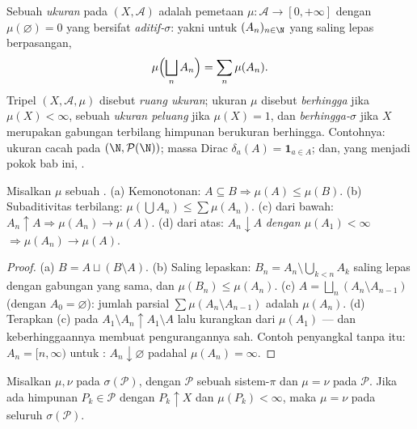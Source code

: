 \begin{definition}\label{def:b3:measure:measure}
Sebuah \emph{ukuran} pada $(X, \mathcal A)$ adalah pemetaan
$\mu \colon \mathcal A \to [0, +\infty]$ dengan $\mu(\varnothing)
= 0$ yang bersifat \emph{aditif-$\sigma$}: yakni untuk
$(A_n)_{n\in\N}$ yang saling lepas berpasangan,
\[
\mu\Bigl(\bigsqcup_n A_n\Bigr) = \sum_n \mu(A_n).
\]
Tripel $(X, \mathcal A, \mu)$ disebut \emph{ruang ukuran}; ukuran $\mu$ disebut
\emph{berhingga} jika $\mu(X) < \infty$, sebuah \emph{ukuran
peluang} jika $\mu(X) = 1$, dan \emph{berhingga-$\sigma$} jika $X$ merupakan
gabungan terbilang himpunan berukuran berhingga. Contohnya: ukuran
cacah pada $(\N, \mathcal P(\N))$; massa Dirac $\delta_a(A)
= \mathbf 1_{a \in A}$; dan, yang menjadi pokok bab ini,
.
\end{definition}

\begin{proposition}\label{prop:b3:measure:basics}
Misalkan $\mu$ sebuah . (a) Kemonotonan: $A \subseteq B
\Rightarrow \mu(A) \leq \mu(B)$. (b) Subaditivitas terbilang:
$\mu(\bigcup A_n) \leq \sum\mu(A_n)$. (c)  dari
bawah: $A_n \uparrow A \Rightarrow \mu(A_n) \to \mu(A)$. (d)
 dari atas: $A_n \downarrow A$ \emph{dengan
$\mu(A_1) < \infty$} $\Rightarrow \mu(A_n) \to \mu(A)$.
\end{proposition}

\begin{proof}
(a) $B = A \sqcup (B\setminus A)$. (b) Saling lepaskan: $B_n = A_n
\setminus \bigcup_{k<n}A_k$ saling lepas dengan gabungan yang sama,
dan $\mu(B_n) \leq \mu(A_n)$. (c) $A = \bigsqcup_n (A_n
\setminus A_{n-1})$ (dengan $A_0 = \varnothing$): jumlah parsial
$\sum\mu(A_n\setminus A_{n-1})$ adalah $\mu(A_n)$. (d) Terapkan (c)
pada $A_1 \setminus A_n \uparrow A_1 \setminus A$ lalu kurangkan
dari $\mu(A_1)$ --- dan keberhinggaannya membuat pengurangannya
sah. Contoh penyangkal tanpa itu: $A_n = [n, \infty)$ untuk
: $A_n \downarrow \varnothing$ padahal $\mu(A_n) =
\infty$.
\end{proof}

\begin{theorem}[Ketunggalan]\label{thm:b3:measure:uniqueness}
Misalkan $\mu, \nu$  pada $\sigma(\mathcal P)$, dengan $\mathcal
P$ sebuah sistem-$\pi$ dan $\mu = \nu$ pada $\mathcal P$. Jika ada
himpunan $P_k \in \mathcal P$ dengan $P_k \uparrow X$ dan
$\mu(P_k) < \infty$, maka $\mu = \nu$ pada seluruh
$\sigma(\mathcal P)$.
\end{theorem}

